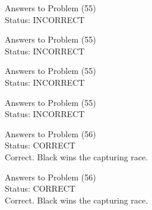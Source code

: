 \documentclass[11pt]{article}
\begin{document}
\begin{minipage}[t]{0.5\textwidth}
  {\centering
  
  Answers to Problem (55)\\
  Status: INCORRECT\\
  
  }
\end{minipage}
\begin{minipage}[t]{0.5\textwidth}
  {\centering
  
  Answers to Problem (55)\\
  Status: INCORRECT\\
  
  }
\end{minipage}
\begin{minipage}[t]{0.5\textwidth}
  {\centering
  
  Answers to Problem (55)\\
  Status: INCORRECT\\
  
  }
\end{minipage}
\begin{minipage}[t]{0.5\textwidth}
  {\centering
  
  Answers to Problem (55)\\
  Status: INCORRECT\\
  
  }
\end{minipage}
\begin{minipage}[t]{0.5\textwidth}
  {\centering
  
  Answers to Problem (56)\\
  Status: CORRECT\\
  Correct. Black wins the capturing race.\\
  }
\end{minipage}
\begin{minipage}[t]{0.5\textwidth}
  {\centering
  
  Answers to Problem (56)\\
  Status: CORRECT\\
  Correct. Black wins the capturing race.\\
  }
\end{minipage}
\end{document}
